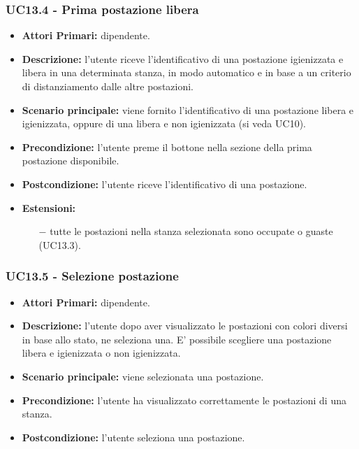 \subsubsection{ UC13.4 - Prima postazione libera }
\begin{itemize}
	\item\textbf{Attori Primari:} dipendente.
	\item\textbf{Descrizione:} l’utente riceve l'identificativo di una postazione igienizzata e libera in una determinata stanza, 
	in modo automatico e in base a un criterio di distanziamento dalle altre postazioni.
	\item\textbf{Scenario principale:} viene fornito l'identificativo di una postazione libera e igienizzata, oppure di una libera e non igienizzata (si veda UC10).
	\item\textbf{Precondizione:} l’utente preme il bottone nella sezione della prima postazione disponibile.
	\item\textbf{Postcondizione:} l’utente riceve l'identificativo di una postazione.
	\item\textbf{Estensioni:}
	\begin{itemize}
		\item[$-$] tutte le postazioni nella stanza selezionata sono occupate o guaste (UC13.3).
	\end{itemize}
\end{itemize}
\subsubsection{ UC13.5 - Selezione postazione }
\begin{itemize}
	\item\textbf{Attori Primari:} dipendente.
	\item\textbf{Descrizione:} l’utente dopo aver visualizzato le postazioni con colori diversi in base allo stato, ne seleziona una. E' possibile scegliere una postazione libera e igienizzata o non igienizzata.
	\item\textbf{Scenario principale:} viene selezionata una postazione.
	\item\textbf{Precondizione:} l’utente ha visualizzato correttamente le postazioni di una stanza.
	\item\textbf{Postcondizione:} l’utente seleziona una postazione.
\end{itemize}
